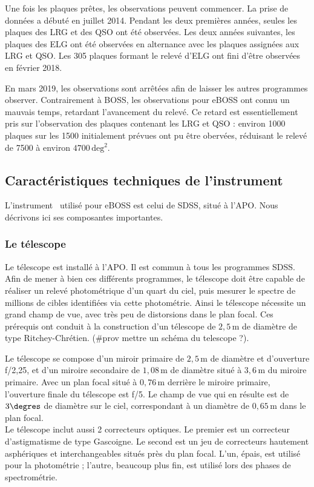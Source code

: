 \documentclass[11pt, twoside, a4paper, openright]{report}
\begin{document}
Une fois les plaques prêtes, les observations peuvent commencer. La prise de données a débuté en juillet 2014. Pendant les deux premières années, seules les plaques des LRG et des QSO ont été observées. Les deux années suivantes, les plaques des ELG ont été observées en alternance avec les plaques assignées aux LRG et QSO. Les \num{305} plaques formant le relevé d'ELG ont fini d'être observées en février 2018. 

En mars 2019, les observations sont arrêtées afin de laisser les autres programmes observer. Contrairement à BOSS, les observations pour eBOSS ont connu un mauvais temps, retardant l'avancement du relevé. Ce retard est essentiellement pris sur l'observation des plaques contenant les LRG et QSO : environ \num{1000} plaques sur les \num{1500} initialement prévues ont pu être obervées, réduisant le relevé de \num{7500} à environ $\num{4700}\,\mathrm{deg^{2}}$.


\subsection{Caractéristiques techniques de l'instrument}
L'instrument~\cite{Gunn2006} utilisé pour eBOSS est celui de SDSS, situé à l'APO. Nous décrivons ici ses composantes importantes.

\subsubsection{Le télescope}
Le télescope est installé à l'APO. Il est commun à tous les programmes SDSS. Afin de mener à bien ces différents programmes, le télescope doit être capable de réaliser un relevé photométrique d'un quart du ciel, puis mesurer le spectre de millions de cibles identifiées via cette photométrie. Ainsi le télescope nécessite un grand champ de vue, avec très peu de distorsions dans le plan focal. Ces prérequis ont conduit à la construction d'un télescope de $2,5\,\mathrm{m}$ de diamètre de type Ritchey-Chrétien. (\#prov mettre un schéma du telescope ?).

Le télescope se compose d'un miroir primaire de $2,5\,\mathrm{m}$ de diamètre et d'ouverture f/2,25, et d'un miroire secondaire de $1,08\,\mathrm{m}$ de diamètre situé à $3,6\,\mathrm{m}$ du miroire primaire. Avec un plan focal situé à $0,76\,\mathrm{m}$ derrière le miroire primaire, l'ouverture finale du télescope est f/5. Le champ de vue qui en résulte est de $3\degres$ de diamètre sur le ciel, correspondant à un diamètre de $0,65\,\mathrm{m}$ dans le plan focal. \\
Le télescope inclut aussi 2 correcteurs optiques. Le premier est un correcteur d'astigmatisme de type Gascoigne. Le second est un jeu de correcteurs hautement asphériques et interchangeables situés près du plan focal. L'un, épais, est utilisé pour la photométrie ; l'autre, beaucoup plus fin, est utilisé lors des phases de spectrométrie.
\end{document}
